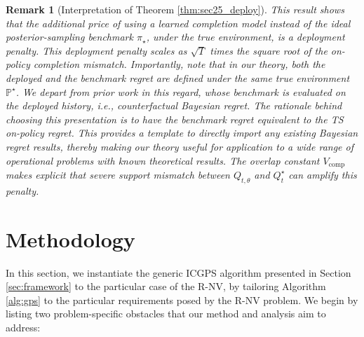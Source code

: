 \documentclass[11pt]{article}
\newtheorem{remark}{Remark}
\renewcommand{\P}{\mathbb{P}}
\begin{document}
\begin{remark}[Interpretation of Theorem \ref{thm:sec25_deploy}]

This result shows that the additional price of using a learned completion model instead of the \textit{ideal} posterior-sampling benchmark $\pi_\star$, under the true environment, is a deployment penalty. This deployment penalty scales as \(\sqrt{T}\) times the square root of the on-policy completion mismatch. Importantly, note that in our theory, \emph{both} the deployed and the benchmark regret are defined under the \emph{same} true environment $\P^\star$. We depart from prior work \citep{zhang2025contextual} in this regard, whose benchmark is evaluated on the deployed history, i.e., counterfactual Bayesian regret. The rationale behind choosing this presentation is to have the benchmark regret equivalent to the TS on-policy regret. This provides a template to directly import any existing Bayesian regret results, thereby making our theory useful for application to a wide range of operational problems with known theoretical results. The overlap constant \(V_{\mathrm{comp}}\) makes explicit that severe support mismatch between \(Q_{t,\theta}\) and \(Q_t^\star\) can amplify this penalty. 
\end{remark}








































\section{Methodology}
\label{sec:newsvendor}

In this section, we instantiate the generic ICGPS algorithm presented in Section \ref{sec:framework} to the particular case of the R-NV, by tailoring Algorithm \ref{alg:gps} to the particular requirements posed by the R-NV problem. We begin by listing two problem-specific obstacles that our method and analysis aim to address:
\end{document}
